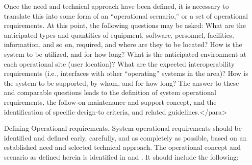 Once the need and technical approach have been defined, it is necessary to translate this into some form of an ``operational scenario,'' or a set of operational requirements. At this point, the following questions may be asked: What are the anticipated types and quantities of equipment, software, personnel, facilities, information, and so on, required, and where are they to be located? How is the system to be utilized, and for how long? What is the anticipated environment at each operational site (user location)? What are the expected interoperability requirements (i.e., interfaces with other ``operating'' systems in the area)? How is the system to be supported, by whom, and for how long? The answer to these and comparable questions leads to the definition of system operational requirements, the follow-on maintenance and support concept, and the identification of specific design-to criteria, and related guidelines.</para>

Defining Operational requirements. System operational requirements should be identified and defined early, carefully, and as completely as possible, based on an established need and selected technical approach. The operational concept and scenario as defined herein is identified in and . It should include the following:

